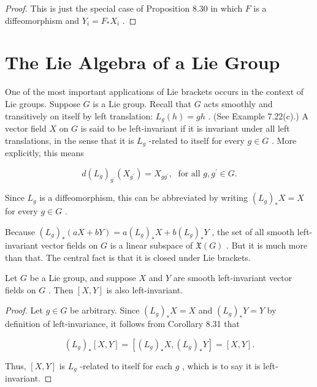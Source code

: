 \begin{proof}
\leanok
This is just the special case of Proposition 8.30 in which $F$ is a diffeomorphism and ${Y}_{i} = {F}_{ * }{X}_{i}$ .
\end{proof}


\section{The Lie Algebra of a Lie Group}

\begin{definition}
\label{def:8-60-extra-1}
\leanok
One of the most important applications of Lie brackets occurs in the context of Lie groups. Suppose $G$ is a Lie group. Recall that $G$ acts smoothly and transitively on itself by left translation: ${L}_{g}\left( h\right)  = {gh}$ . (See Example 7.22(c).) A vector field $X$ on $G$ is said to be left-invariant if it is invariant under all left translations, in the sense that it is ${L}_{g}$ -related to itself for every $g \in  G$ . More explicitly, this means

\[
d{\left( {L}_{g}\right) }_{{g}^{\prime }}\left( {X}_{{g}^{\prime }}\right)  = {X}_{g{g}^{\prime }},\;\text{ for all }g,{g}^{\prime } \in  G. \tag{8.12}
\]

Since ${L}_{g}$ is a diffeomorphism, this can be abbreviated by writing ${\left( {L}_{g}\right) }_{ * }X = X$ for every $g \in  G$ .

Because ${\left( {L}_{g}\right) }_{ * }\left( {{aX} + {bY}}\right)  = a{\left( {L}_{g}\right) }_{ * }X + b{\left( {L}_{g}\right) }_{ * }Y$ , the set of all smooth left-invariant vector fields on $G$ is a linear subspace of $\mathfrak{X}\left( G\right)$ . But it is much more than that. The central fact is that it is closed under Lie brackets.
\end{definition}

\begin{proposition}
\label{prop:8-33}
\leanok
{}
Let $G$ be a Lie group, and suppose $X$ and $Y$ are smooth left-invariant vector fields on $G$ . Then $\left\lbrack  {X, Y}\right\rbrack$ is also left-invariant.
\end{proposition}

\begin{proof}
\leanok
Let $g \in  G$ be arbitrary. Since ${\left( {L}_{g}\right) }_{ * }X = X$ and ${\left( {L}_{g}\right) }_{ * }Y = Y$ by definition of left-invariance, it follows from Corollary 8.31 that

\[
{\left( {L}_{g}\right) }_{ * }\left\lbrack  {X, Y}\right\rbrack   = \left\lbrack  {{\left( {L}_{g}\right) }_{ * }X,{\left( {L}_{g}\right) }_{ * }Y}\right\rbrack   = \left\lbrack  {X, Y}\right\rbrack  .
\]

Thus, $\left\lbrack  {X, Y}\right\rbrack$ is ${L}_{g}$ -related to itself for each $g$ , which is to say it is left-invariant.
\end{proof}

